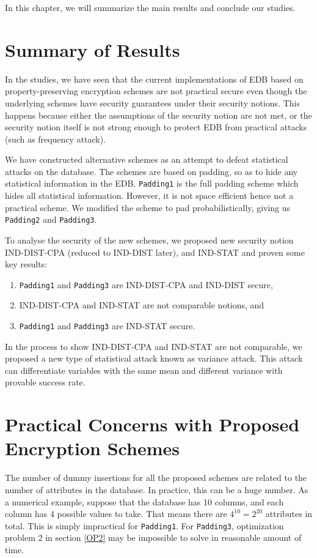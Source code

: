 In this chapter, we will summarize the main results and conclude our studies.


\section{Summary of Results}
In the studies, we have seen that the current implementations of EDB based on property-preserving encryption schemes are not practical secure even though the underlying schemes have security guarantees under their security notions. This happens because either the assumptions of the security notion are not met, or the security notion itself is not strong enough to protect EDB from practical attacks (such as frequency attack).

We have constructed alternative schemes as an attempt to defeat statistical attacks on the database. The schemes are based on padding, so as to hide any statistical information in the EDB. \texttt{Padding1} is the full padding scheme which hides all statistical information. However, it is not space efficient hence not a practical scheme. We modified the scheme to pad probabilistically, giving us \texttt{Padding2} and \texttt{Padding3}.

To analyse the security of the new schemes, we proposed new security notion IND-DIST-CPA (reduced to IND-DIST later), and IND-STAT and proven some key results:
\begin{enumerate}
\item \texttt{Padding1} and \texttt{Padding3} are IND-DIST-CPA and IND-DIST secure,
\item IND-DIST-CPA and IND-STAT are not comparable notions, and
\item \texttt{Padding1} and \texttt{Padding3} are IND-STAT secure.
\end{enumerate}

In the process to show IND-DIST-CPA and IND-STAT are not comparable, we proposed a new type of statistical attack known as variance attack. This attack can differentiate variables with the same mean and different variance with provable success rate.




\section{Practical Concerns with Proposed Encryption Schemes}
The number of dummy insertions for all the proposed schemes are related to the number of attributes in the database. In practice, this can be a huge number. As a numerical example, suppose that the database has 10 columns, and each column has 4 possible values to take. That means there are $4^{10} = 2^{20}$ attributes in total. This is simply impractical for \texttt{Padding1}. For \texttt{Padding3}, optimization problem 2 in section \ref{OP2} may be impossible to solve in reasonable amount of time.

